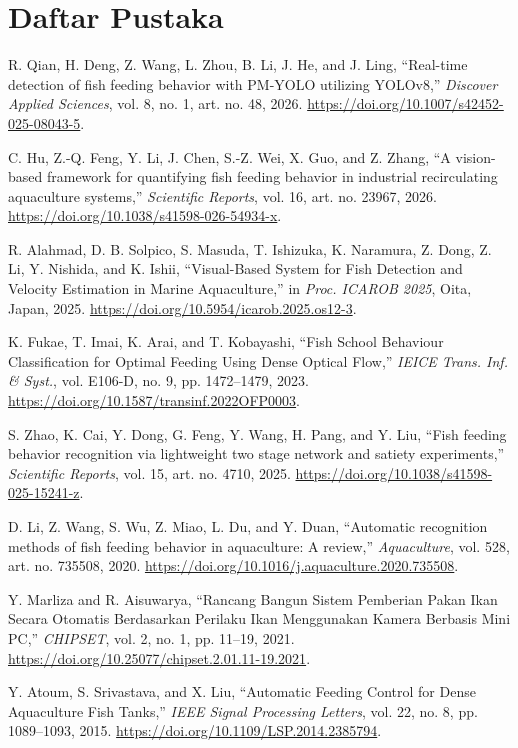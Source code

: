 \documentclass[11pt,a4paper]{article}
\begin{document}
\section*{Daftar Pustaka}
{\sloppy
\begin{enumerate}[label={[\arabic*]}, leftmargin=2em]
    \item R. Qian, H. Deng, Z. Wang, L. Zhou, B. Li, J. He, and J. Ling, ``Real-time detection of fish feeding behavior with PM-YOLO utilizing YOLOv8,'' \textit{Discover Applied Sciences}, vol. 8, no. 1, art. no. 48, 2026. \url{https://doi.org/10.1007/s42452-025-08043-5}.
    \item C. Hu, Z.-Q. Feng, Y. Li, J. Chen, S.-Z. Wei, X. Guo, and Z. Zhang, ``A vision-based framework for quantifying fish feeding behavior in industrial recirculating aquaculture systems,'' \textit{Scientific Reports}, vol. 16, art. no. 23967, 2026. \url{https://doi.org/10.1038/s41598-026-54934-x}.
    \item R. Alahmad, D. B. Solpico, S. Masuda, T. Ishizuka, K. Naramura, Z. Dong, Z. Li, Y. Nishida, and K. Ishii, ``Visual-Based System for Fish Detection and Velocity Estimation in Marine Aquaculture,'' in \textit{Proc. ICAROB 2025}, Oita, Japan, 2025. \url{https://doi.org/10.5954/icarob.2025.os12-3}.
    \item K. Fukae, T. Imai, K. Arai, and T. Kobayashi, ``Fish School Behaviour Classification for Optimal Feeding Using Dense Optical Flow,'' \textit{IEICE Trans. Inf. \& Syst.}, vol. E106-D, no. 9, pp. 1472--1479, 2023. \url{https://doi.org/10.1587/transinf.2022OFP0003}.
    \item S. Zhao, K. Cai, Y. Dong, G. Feng, Y. Wang, H. Pang, and Y. Liu, ``Fish feeding behavior recognition via lightweight two stage network and satiety experiments,'' \textit{Scientific Reports}, vol. 15, art. no. 4710, 2025. \url{https://doi.org/10.1038/s41598-025-15241-z}.
    \item D. Li, Z. Wang, S. Wu, Z. Miao, L. Du, and Y. Duan, ``Automatic recognition methods of fish feeding behavior in aquaculture: A review,'' \textit{Aquaculture}, vol. 528, art. no. 735508, 2020. \url{https://doi.org/10.1016/j.aquaculture.2020.735508}.
    \item Y. Marliza and R. Aisuwarya, ``Rancang Bangun Sistem Pemberian Pakan Ikan Secara Otomatis Berdasarkan Perilaku Ikan Menggunakan Kamera Berbasis Mini PC,'' \textit{CHIPSET}, vol. 2, no. 1, pp. 11--19, 2021. \url{https://doi.org/10.25077/chipset.2.01.11-19.2021}.
    \item Y. Atoum, S. Srivastava, and X. Liu, ``Automatic Feeding Control for Dense Aquaculture Fish Tanks,'' \textit{IEEE Signal Processing Letters}, vol. 22, no. 8, pp. 1089--1093, 2015. \url{https://doi.org/10.1109/LSP.2014.2385794}.

\end{enumerate}}
\end{document}
